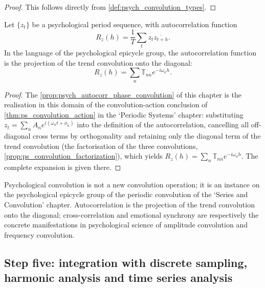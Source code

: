 \begin{proof}
This follows directly from \cref{def:psych_convolution_types}.
\end{proof}

\begin{proposition}\label{prop:psych_autocorr_phase_convolution}
Let $\{z_t\}$ be a psychological period sequence, with autocorrelation function
\[
R_z(h)=\frac1T\sum_t z_t\overline{z_{t+h}}.
\]
In the language of the psychological epicycle group, the autocorrelation function is the projection of the trend convolution onto the diagonal:
\[
R_z(h)=\sum_n\mathbb T_{nn}e^{-i\omega_n h}.
\]
\end{proposition}

\begin{proof}
The \cref{prop:psych_autocorr_phase_convolution} of this chapter is the realisation in this domain of the convolution-action conclusion of \cref{thm:ps_convolution_action} in the `Periodic Systems' chapter:
substituting $z_t=\sum_n A_n e^{i(\omega_n t+\phi_n)}$ into the definition of the autocorrelation, cancelling all off-diagonal cross terms by orthogonality and retaining only the diagonal term of the trend convolution
(the factorisation of the three convolutions, \cref{prop:ps_convolution_factorization}), which yields $R_z(h)=\sum_n\mathbb T_{nn}e^{-i\omega_n h}$.
The complete expansion is given there.
\end{proof}

\begin{remark}\label{rem:psych_convolution_relation}
Psychological convolution is not a new convolution operation; it is an instance on the psychological epicycle group of the periodic convolution of the `Series and Convolution' chapter. Autocorrelation is the projection of the trend convolution onto the diagonal; cross-correlation and emotional synchrony are respectively the concrete manifestations in psychological science of amplitude convolution and frequency convolution.
\end{remark}

\subsection{Step five: integration with discrete sampling, harmonic analysis and time series analysis}

